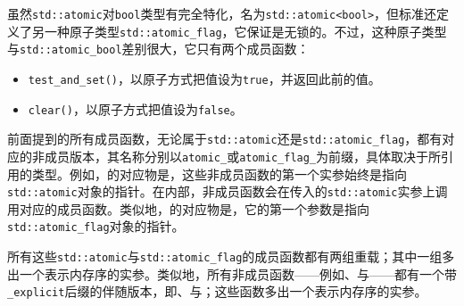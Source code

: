 
虽然\texttt{std::\allowbreak{}atomic}对\texttt{bool}类型有完全特化，名为\texttt{std::\allowbreak{}atomic<\allowbreak{}bool>}，但标准还定义了另一种原子类型\texttt{std::\allowbreak{}atomic\_\allowbreak{}flag}，它保证是无锁的。不过，这种原子类型与\texttt{std::\allowbreak{}atomic\_\allowbreak{}bool}差别很大，它只有两个成员函数：



\begin{itemize}
\item \texttt{test\_\allowbreak{}and\_\allowbreak{}set()}，以原子方式把值设为\texttt{true}，并返回此前的值。



\item \texttt{clear()}，以原子方式把值设为\texttt{false}。

\end{itemize}



前面提到的所有成员函数，无论属于\texttt{std::\allowbreak{}atomic}还是\texttt{std::\allowbreak{}atomic\_\allowbreak{}flag}，都有对应的非成员版本，其名称分别以\texttt{atomic\_}或\texttt{atomic\_\allowbreak{}flag\_}为前缀，具体取决于所引用的类型。例如，的对应物是，这些非成员函数的第一个实参始终是指向\texttt{std::\allowbreak{}atomic}对象的指针。在内部，非成员函数会在传入的\texttt{std::\allowbreak{}atomic}实参上调用对应的成员函数。类似地，的对应物是，它的第一个参数是指向\texttt{std::\allowbreak{}atomic\_\allowbreak{}flag}对象的指针。



所有这些\texttt{std::\allowbreak{}atomic}与\texttt{std::\allowbreak{}atomic\_\allowbreak{}flag}的成员函数都有两组重载；其中一组多出一个表示内存序的实参。类似地，所有非成员函数——例如、与——都有一个带\texttt{\_\allowbreak{}explicit}后缀的伴随版本，即、与；这些函数多出一个表示内存序的实参。


